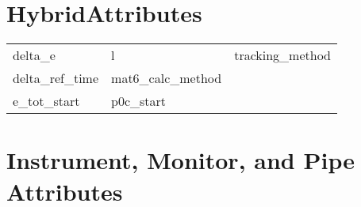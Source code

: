  \section{HybridAttributes}
 \label{s:list.hybrid}
 
 \begin{tabular}{lll} \toprule
delta_e                     & l                           & tracking_method             \\
delta_ref_time              & mat6_calc_method            &                             \\
e_tot_start                 & p0c_start                   &                             \\
 \bottomrule
 \end{tabular}
 \vfill
 
 \section{Instrument, Monitor, and Pipe Attributes}
 \label{s:list.instrument}
 
